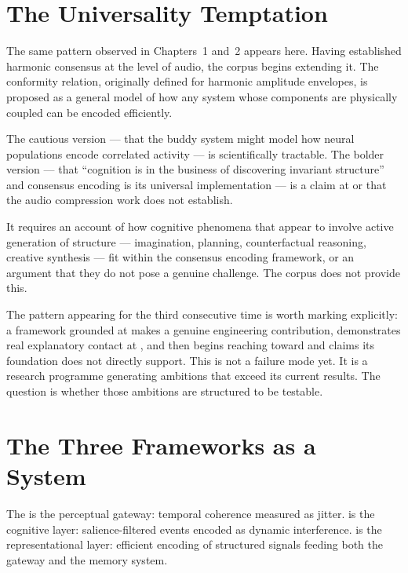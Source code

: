 \section{The Universality Temptation}
\label{sec:hcf1-universality}

The same pattern observed in Chapters~1 and~2 appears here.
Having established harmonic consensus at the level of audio,
the corpus begins extending it. The conformity relation, originally
defined for harmonic amplitude envelopes, is proposed as a general
model of how any system whose components are physically coupled
can be encoded efficiently.

The cautious version --- that the buddy system might model how
neural populations encode correlated activity --- is scientifically
tractable. The bolder version --- that ``cognition is in the
business of discovering invariant structure'' and consensus encoding
is its universal implementation --- is a claim at \LevelIII{}
or \LevelIV{} that the audio compression work does not establish.

It requires an account of how cognitive phenomena that appear to
involve active generation of structure --- imagination, planning,
counterfactual reasoning, creative synthesis --- fit within the
consensus encoding framework, or an argument that they do not
pose a genuine challenge. The corpus does not provide this.

The pattern appearing for the third consecutive time is worth
marking explicitly: a framework grounded at \LevelI{} makes
a genuine engineering contribution, demonstrates real explanatory
contact at \LevelII{}, and then begins reaching toward
\LevelIII{} and \LevelIV{} claims its foundation does not
directly support. This is not a failure mode yet. It is a research
programme generating ambitions that exceed its current results.
The question is whether those ambitions are structured to be
testable.

\section{The Three Frameworks as a System}
\label{sec:three-frameworks}

The \Marine{} is the perceptual gateway: temporal coherence
measured as jitter. \MEMeight{} is the cognitive layer: salience-filtered
events encoded as dynamic interference. \HCFone{} is the
representational layer: efficient encoding of structured signals
feeding both the gateway and the memory system.

